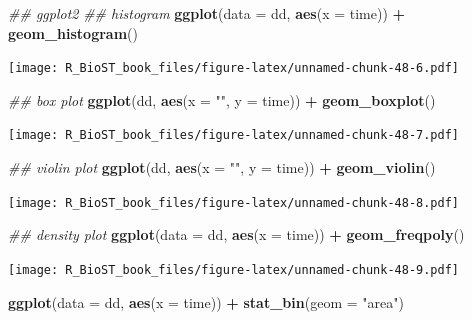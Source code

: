 \documentclass[
]{book}
\newenvironment{Shaded}{\begin{snugshade}}{\end{snugshade}}
\newcommand{\CommentTok}[1]{\textcolor[rgb]{0.56,0.35,0.01}{\textit{#1}}}
\newcommand{\DataTypeTok}[1]{\textcolor[rgb]{0.13,0.29,0.53}{#1}}
\newcommand{\KeywordTok}[1]{\textcolor[rgb]{0.13,0.29,0.53}{\textbf{#1}}}
\newcommand{\NormalTok}[1]{#1}
\newcommand{\OperatorTok}[1]{\textcolor[rgb]{0.81,0.36,0.00}{\textbf{#1}}}
\newcommand{\StringTok}[1]{\textcolor[rgb]{0.31,0.60,0.02}{#1}}
\begin{document}
\begin{Shaded}
\begin{Highlighting}[]
\CommentTok{\#\# ggplot2 }
\CommentTok{\#\# histogram}
\KeywordTok{ggplot}\NormalTok{(}\DataTypeTok{data =}\NormalTok{ dd, }\KeywordTok{aes}\NormalTok{(}\DataTypeTok{x =}\NormalTok{ time)) }\OperatorTok{+}\StringTok{ }
\StringTok{  }\KeywordTok{geom\_histogram}\NormalTok{()}
\end{Highlighting}
\end{Shaded}

\texttt{[image: R\_BioST\_book\_files/figure-latex/unnamed-chunk-48-6.pdf]}

\begin{Shaded}
\begin{Highlighting}[]
\CommentTok{\#\# box plot}
\KeywordTok{ggplot}\NormalTok{(dd, }\KeywordTok{aes}\NormalTok{(}\DataTypeTok{x =} \StringTok{""}\NormalTok{, }\DataTypeTok{y =}\NormalTok{ time)) }\OperatorTok{+}\StringTok{ }
\StringTok{  }\KeywordTok{geom\_boxplot}\NormalTok{()}
\end{Highlighting}
\end{Shaded}

\texttt{[image: R\_BioST\_book\_files/figure-latex/unnamed-chunk-48-7.pdf]}

\begin{Shaded}
\begin{Highlighting}[]
\CommentTok{\#\# violin plot}
\KeywordTok{ggplot}\NormalTok{(dd, }\KeywordTok{aes}\NormalTok{(}\DataTypeTok{x =} \StringTok{""}\NormalTok{, }\DataTypeTok{y =}\NormalTok{ time)) }\OperatorTok{+}\StringTok{ }
\StringTok{  }\KeywordTok{geom\_violin}\NormalTok{()}
\end{Highlighting}
\end{Shaded}

\texttt{[image: R\_BioST\_book\_files/figure-latex/unnamed-chunk-48-8.pdf]}

\begin{Shaded}
\begin{Highlighting}[]
\CommentTok{\#\# density plot}
\KeywordTok{ggplot}\NormalTok{(}\DataTypeTok{data =}\NormalTok{ dd, }\KeywordTok{aes}\NormalTok{(}\DataTypeTok{x =}\NormalTok{ time)) }\OperatorTok{+}\StringTok{ }
\StringTok{  }\KeywordTok{geom\_freqpoly}\NormalTok{()}
\end{Highlighting}
\end{Shaded}

\texttt{[image: R\_BioST\_book\_files/figure-latex/unnamed-chunk-48-9.pdf]}

\begin{Shaded}
\begin{Highlighting}[]
\KeywordTok{ggplot}\NormalTok{(}\DataTypeTok{data =}\NormalTok{ dd, }\KeywordTok{aes}\NormalTok{(}\DataTypeTok{x =}\NormalTok{ time)) }\OperatorTok{+}\StringTok{ }
\StringTok{  }\KeywordTok{stat\_bin}\NormalTok{(}\DataTypeTok{geom =} \StringTok{"area"}\NormalTok{)}
\end{Highlighting}
\end{Shaded}
\end{document}
